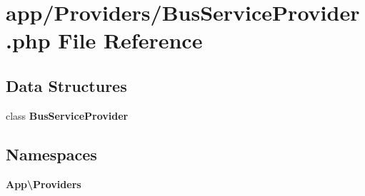 \section{app/\+Providers/\+Bus\+Service\+Provider.php File Reference}
\label{app_2_providers_2_bus_service_provider_8php}
\subsection*{Data Structures}
\begin{DoxyCompactItemize}
\item 
class {\bf Bus\+Service\+Provider}
\end{DoxyCompactItemize}
\subsection*{Namespaces}
\begin{DoxyCompactItemize}
\item 
 {\bf App\textbackslash{}\+Providers}
\end{DoxyCompactItemize}
